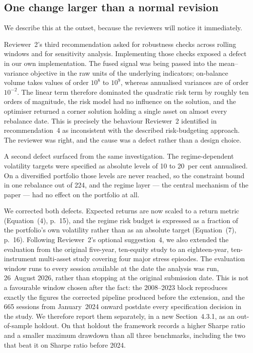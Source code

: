 \documentclass[11pt,a4paper]{article}
\begin{document}
\subsection*{One change larger than a normal revision}

We describe this at the outset, because the reviewers will notice it immediately.

Reviewer~2's third recommendation asked for robustness checks across rolling windows and
for sensitivity analysis. Implementing those checks exposed a defect in our own
implementation. The fused signal was being passed into the mean--variance objective in the
raw units of the underlying indicators; on-balance volume takes values of order $10^{8}$
to $10^{9}$, whereas annualised variances are of order $10^{-2}$. The linear term
therefore dominated the quadratic risk term by roughly ten orders of magnitude, the risk
model had no influence on the solution, and the optimiser returned a corner solution
holding a single asset on almost every rebalance date. This is precisely the behaviour
Reviewer~2 identified in recommendation~4 as inconsistent with the described
risk-budgeting approach. The reviewer was right, and the cause was a defect rather than a
design choice.

A second defect surfaced from the same investigation. The regime-dependent volatility
targets were specified as absolute levels of 10 to 20~per cent annualised. On a
diversified portfolio those levels are never reached, so the constraint bound in one
rebalance out of 224, and the regime layer --- the central mechanism of the paper --- had
no effect on the portfolio at all.

We corrected both defects. Expected returns are now scaled to a return metric
(Equation~(4), p.~15), and the regime risk budget is expressed as a fraction of the
portfolio's own volatility rather than as an absolute target (Equation~(7), p.~16).
Following Reviewer~2's optional suggestion~4, we also extended the evaluation from the
original five-year, ten-equity study to an eighteen-year, ten-instrument multi-asset study
covering four major stress episodes. The evaluation window runs to every session available
at the date the analysis was run, 26~August 2026, rather than stopping at the original
submission date. This is not a favourable window chosen after the fact: the 2008--2023
block reproduces exactly the figures the corrected pipeline produced before the extension,
and the 665 sessions from January~2024 onward postdate every specification decision in the
study. We therefore report them separately, in a new Section~4.3.1, as an out-of-sample
holdout. On that holdout the framework records a higher Sharpe ratio and a smaller maximum
drawdown than all three benchmarks, including the two that beat it on Sharpe ratio before
2024.
\end{document}
